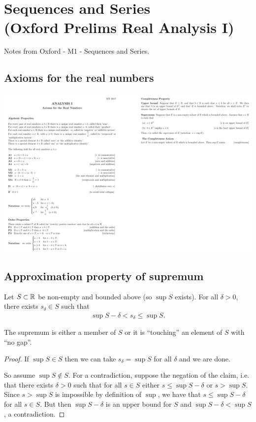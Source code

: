 \let\B\undefined
\newcommand{\B}{\mathcal B}
\let\T\undefined
\newcommand{\T}{\mathcal T}

\section{Sequences and Series\\(Oxford Prelims Real Analysis I)}

Notes from Oxford - M1 - Sequences and Series.

\subsection{Axioms for the real numbers}
\begin{mdframed}
\includegraphics[width=400pt]{img/oxford-prelims-M2-analysis-I-axioms-for-real-numbers.png}
\end{mdframed}

\subsection{Approximation property of supremum}
\begin{theorem*}
  Let $S \subset \mathbb{R}$ be non-empty and bounded above (so $\sup S$ exists). For all $\delta > 0$,
  there exists $s_\delta \in S$ such that
  \begin{align*}
    \sup S - \delta < s_\delta \leq \sup S.
  \end{align*}
  \begin{intuition*}
    The supremum is either a member of $S$ or it is ``touching'' an element of $S$ with ``no gap''.
  \end{intuition*}
  \begin{proof}
    If $\sup S \in S$ then we can take $s_\delta = \sup S$ for all $\delta$ and we are done.

    So assume $\sup S \not\in S$. For a contradiction, suppose the negation of the claim, i.e. that
    there exists $\delta > 0$ such that for all $s \in S$ either $s \leq \sup S - \delta$ or
    $s > \sup S$. Since $s > \sup S$ is impossible by definition of $\sup$, we have that
    $s \leq \sup S - \delta$ for all $s \in S$. But then $\sup S - \delta$ is an upper bound for
    $S$ and $\sup S - \delta < \sup S$, a contradiction.
  \end{proof}
\end{theorem*}

